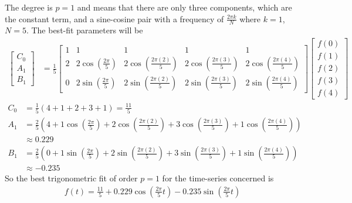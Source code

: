 \begin{solution}
The degree is $p=1$ and means that there are only three components, which are the constant term, and a sine-cosine pair with a frequency of $\frac{2\pi k}{N}$ where $k=1$, $N=5$. The best-fit parameters will be
\begin{align*}
\begin{bmatrix}
C_0 \\
A_1 \\
B_1
\end{bmatrix}
&= 
\frac{1}{5}
\begin{bmatrix}
1 & 1 & 1 & 1 & 1 \\
2 & 2\cos(\frac{2\pi}{5}) & 2\cos(\frac{2\pi(2)}{5}) & 2\cos(\frac{2\pi(3)}{5}) & 2\cos(\frac{2\pi(4)}{5}) \\
0 & 2\sin(\frac{2\pi}{5}) & 2\sin(\frac{2\pi(2)}{5}) & 2\sin(\frac{2\pi(3)}{5}) & 2\sin(\frac{2\pi(4)}{5})
\end{bmatrix}
\begin{bmatrix}
f(0)\\
f(1)\\
f(2)\\
f(3)\\
f(4)
\end{bmatrix} 
\end{align*}
\begin{align*}
C_0 &= \frac{1}{5} (4+1+2+3+1) = \frac{11}{5} \\
A_1 &= \frac{2}{5} (4 + 1\cos(\frac{2\pi}{5}) + 2\cos(\frac{2\pi(2)}{5}) + 3\cos(\frac{2\pi(3)}{5}) + 1\cos(\frac{2\pi(4)}{5})) \\
&\approx 0.229 \\
B_1 &= \frac{2}{5} (0 + 1\sin(\frac{2\pi}{5}) + 2\sin(\frac{2\pi(2)}{5}) + 3\sin(\frac{2\pi(3)}{5}) + 1\sin(\frac{2\pi(4)}{5})) \\
&\approx -0.235
\end{align*}
So the best trigonometric fit of order $p=1$ for the time-series concerned is
\begin{align*}
f(t) = \frac{11}{5} + 0.229 \cos(\frac{2\pi}{5}t) - 0.235 \sin(\frac{2\pi}{5}t)
\end{align*}
\end{solution}
